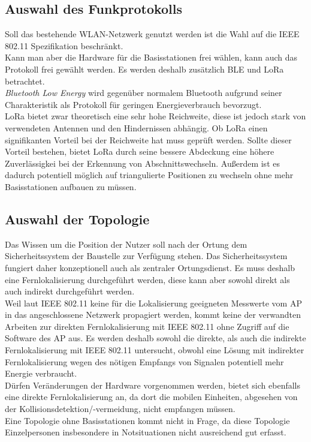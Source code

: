 \subsection{Auswahl des Funkprotokolls}
Soll das bestehende WLAN-Netzwerk genutzt werden ist die Wahl auf die IEEE 802.11 Spezifikation beschränkt.\\
Kann man aber die Hardware für die Basisstationen frei wählen, kann auch das Protokoll frei gewählt werden.
Es werden deshalb zusätzlich BLE und LoRa betrachtet.\\
\emph{Bluetooth Low Energy} wird gegenüber normalem Bluetooth aufgrund seiner Charakteristik als Protokoll für geringen Energieverbrauch bevorzugt.\\
LoRa bietet zwar theoretisch eine sehr hohe Reichweite, diese ist jedoch stark von verwendeten Antennen und den Hindernissen abhängig.
Ob LoRa einen signifikanten Vorteil bei der Reichweite hat muss geprüft werden.
Sollte dieser Vorteil bestehen, bietet LoRa durch seine bessere Abdeckung eine höhere Zuverlässigkei bei der Erkennung von Abschnittswechseln. 
Außerdem ist es dadurch potentiell möglich auf triangulierte Positionen zu wechseln ohne mehr Basisstationen aufbauen zu müssen.

\subsection{Auswahl der Topologie}
Das Wissen um die Position der Nutzer soll nach der Ortung dem Sicherheitssystem der Baustelle zur Verfügung stehen. 
Das Sicherheitssystem fungiert daher konzeptionell auch als zentraler Ortungsdienst.
Es muss deshalb eine Fernlokalisierung durchgeführt werden, diese kann aber sowohl direkt als auch indirekt durchgeführt werden. \\
Weil laut IEEE 802.11 keine für die Lokalisierung geeigneten Messwerte vom AP in das angeschlossene Netzwerk propagiert werden, kommt keine der verwandten Arbeiten zur direkten Fernlokalisierung mit IEEE 802.11 ohne Zugriff auf die Software des AP aus.
Es werden deshalb sowohl die direkte, als auch die indirekte Fernlokalisierung mit IEEE 802.11 untersucht, obwohl eine Lösung mit indirekter Fernlokalisierung wegen des nötigen Empfangs von Signalen potentiell mehr Energie verbraucht.\\
Dürfen Veränderungen der Hardware vorgenommen werden, bietet sich ebenfalls eine direkte Fernlokalisierung an, da dort die mobilen Einheiten, abgesehen von der Kollisionsdetektion/-vermeidung, nicht empfangen müssen.\\
Eine Topologie ohne Basisstationen kommt nicht in Frage, da diese Topologie Einzelpersonen insbesondere in Notsituationen nicht ausreichend gut erfasst.




